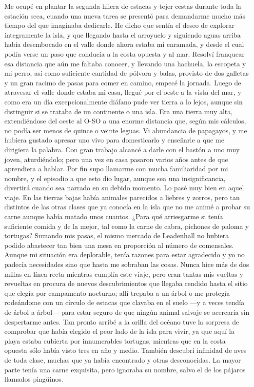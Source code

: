 \documentclass{novela}
\begin{document}
    Me ocupé en plantar la segunda hilera de estacas y tejer cestas durante toda la estación seca, cuando una nueva tarea se presentó para demandarme mucho más tiempo del que imaginaba dedicarle. He dicho que sentía el deseo de explorar íntegramente la isla, y que llegando hasta el arroyuelo y siguiendo aguas arriba había desembocado en el valle donde ahora estaba mi enramada, y desde el cual podía verse un paso que conducía a la costa opuesta y al mar. Resolví franquear esa distancia que aún me faltaba conocer, y llevando una hachuela, la escopeta y mi perro, así como suficiente cantidad de pólvora y balas, provisto de dos galletas y un gran racimo de pasas para comer en camino, empecé la jornada. Luego de atravesar el valle donde estaba mi casa, llegué por el oeste a la vista del mar, y como era un día excepcionalmente diáfano pude ver tierra a lo lejos, aunque sin distinguir si se trataba de un continente o una isla. Era una tierra muy alta, extendiéndose del oeste al O-SO a una enorme distancia que, según mis cálculos, no podía ser menos de quince o veinte leguas.
    Vi abundancia de papagayos, y me hubiera gustado apresar uno vivo para domesticarlo y enseñarle a que me dirigiera la palabra. Con gran trabajo alcancé a darle con el bastón a uno muy joven, aturdiéndolo; pero una vez en casa pasaron varios años antes de que aprendiera a hablar. Por fin supo llamarme con mucha familiaridad por mi nombre, y el episodio a que esto dio lugar, aunque sea una insignificancia, divertirá cuando sea narrado en su debido momento.
    Lo pasé muy bien en aquel viaje. En las tierras bajas había animales parecidos a liebres y zorros, pero tan distintos de las otras clases que ya conocía en la isla que no me animé a probar su carne aunque había matado unos cuantos. ¿Para qué arriesgarme si tenía suficiente comida y de la mejor, tal como la carne de cabra, pichones de paloma y tortugas? Sumando mis pasas, el mismo mercado de Leadenhall no hubiera podido abastecer tan bien una mesa en proporción al número de comensales. Aunque mi situación era deplorable, tenía razones para estar agradecido y yo no padecía necesidades sino que hasta me sobraban las cosas. Nunca hice más de dos millas en línea recta mientras cumplía este viaje, pero eran tantas mis vueltas y revueltas en procura de nuevos descubrimientos que llegaba rendido hasta el sitio que elegía por campamento nocturno; allí trepaba a un árbol o me protegía rodeándome con un círculo de estacas que clavaba en el suelo —y a veces tendía de árbol a árbol— para estar seguro de que ningún animal salvaje se acercaría sin despertarme antes. Tan pronto arribé a la orilla del océano tuve la sorpresa de comprobar que había elegido el peor lado de la isla para vivir, ya que aquí la playa estaba cubierta por innumerables tortugas, mientras que en la costa opuesta sólo había visto tres en año y medio. También descubrí infinidad de aves de toda clase, muchas que ya había encontrado y otras desconocidas. La mayor parte tenía una carne exquisita, pero ignoraba su nombre, salvo el de los pájaros llamados pingüinos.
\end{document}
